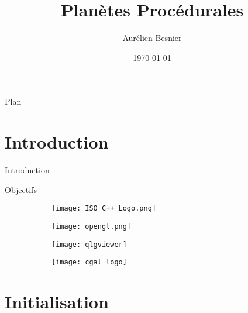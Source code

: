 \documentclass{beamer}
\title{Planètes Procédurales}
\institute{Master 2 IMAGINE}
\author[A. Besnier]{Aurélien Besnier}
\date{\today}
\begin{document}
\maketitle

\begin{frame}{Plan}
    \tableofcontents
\end{frame}

\section{Introduction}

\begin{frame}{Introduction}

\begin{block}{Objectifs}

\end{block}

\begin{figure}[H]
        \begin{subfigure}[b]{0.25\textwidth}
                \centering
                \texttt{[image: ISO\_C++\_Logo.png]}
        \end{subfigure}%
        \begin{subfigure}[b]{0.25\textwidth}
                \centering
                \texttt{[image: opengl.png]}
        \end{subfigure}%
        \begin{subfigure}[b]{0.25\textwidth}
                \centering
                \texttt{[image: qlgviewer]}
        \end{subfigure}%
        \begin{subfigure}[b]{0.25\textwidth}
                \centering
                \texttt{[image: cgal\_logo]}
        \end{subfigure}
\end{figure}
    
\end{frame}


\section{Initialisation}
\end{document}
